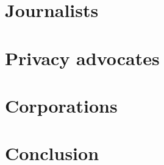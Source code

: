 

\section{Journalists}


\section{Privacy advocates}


\section{Corporations}


\section{Conclusion}
